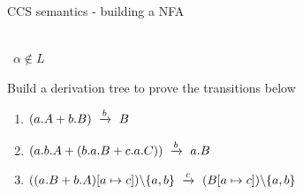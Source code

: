 \documentclass[aspectratio=169]{beamer}
\begin{document}
\exerciseBack
\begin{slide}{CCS semantics - building a NFA}
\small 
\centering
\newcommand{\msep}{~~~~~~}

\msep
{} %
\msep
{} %
\\[3mm]
~${\alpha%
                                                                  \notin L}$
\msep
{}
\\[6mm]

\pause

\begin{exampleblock}{\exercise Build a derivation tree to prove the transitions below}
  \begin{enumerate}
    \item $(a.A + b.B) ~\xrightarrow{b}~ B$
    \item $(a.b.A + (b.a.B + c.a.C)) ~\xrightarrow{b}~ a.B$
    \item $((a.B + b.A)[a \mapsto c])\backslash\{a,b\} ~\xrightarrow{c}~ (B[a\mapsto c])\backslash\{a,b\}$
  \end{enumerate}
\end{exampleblock}

\end{slide}
\end{document}
